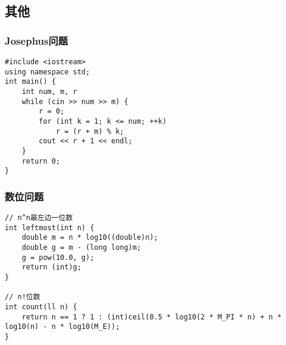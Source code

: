 \documentclass[a4paper]{article}
\begin{document}
\subsection{其他}
\subsubsection{Josephus问题}
\begin{lstlisting}
#include <iostream>
using namespace std;
int main() {
	int num, m, r
	while (cin >> num >> m) {
		r = 0;
		for (int k = 1; k <= num; ++k)
			r = (r + m) % k;
		cout << r + 1 << endl;
	}
	return 0;
}
\end{lstlisting}
\subsubsection{数位问题}
\begin{lstlisting}
// n^n最左边一位数
int leftmost(int n) {
	double m = n * log10((double)n);
	double g = m - (long long)m;
	g = pow(10.0, g);
	return (int)g;
}

// n!位数
int count(ll n) {
	return n == 1 ? 1 : (int)ceil(0.5 * log10(2 * M_PI * n) + n * log10(n) - n * log10(M_E));
}

\end{lstlisting}
\end{document}
